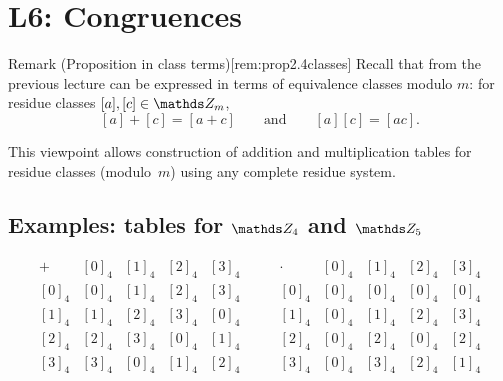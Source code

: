 \documentclass[10pt]{article}
\theoremstyle{definition}
\theoremstyle{plain}
\numberwithin{equation}{section}
\begin{document}
\section*{L6: Congruences}

\begin{define}{Remark (Proposition  in class terms)}[rem:prop2.4classes]
Recall that  from the previous lecture can be expressed in terms of
equivalence classes modulo $m$: for residue classes $[a],[c]\in\setZ_m$,
\[
[a]+[c]=[a+c]\qquad\text{and}\qquad [a][c]=[ac].
\]
\end{define}

This viewpoint allows construction of addition and multiplication tables for residue classes
(modulo~$m$) using any complete residue system.

\subsection*{Examples: tables for $\setZ_4$ and $\setZ_5$}
\[
  \begin{array}{c|cccc}
    + & \left[0\right]_4 & \left[1\right]_4 & \left[2\right]_4 & \left[3\right]_4\\\hline
    \left[0\right]_4 & \left[0\right]_4 & \left[1\right]_4 & \left[2\right]_4 & \left[3\right]_4\\
    \left[1\right]_4 & \left[1\right]_4 & \left[2\right]_4 & \left[3\right]_4 & \left[0\right]_4\\
    \left[2\right]_4 & \left[2\right]_4 & \left[3\right]_4 & \left[0\right]_4 & \left[1\right]_4\\
    \left[3\right]_4 & \left[3\right]_4 & \left[0\right]_4 & \left[1\right]_4 & \left[2\right]_4
  \end{array}
  \qquad
  \begin{array}{c|cccc}
    \cdot & \left[0\right]_4 & \left[1\right]_4 & \left[2\right]_4 & \left[3\right]_4\\\hline
    \left[0\right]_4 & \left[0\right]_4 & \left[0\right]_4 & \left[0\right]_4 & \left[0\right]_4\\
    \left[1\right]_4 & \left[0\right]_4 & \left[1\right]_4 & \left[2\right]_4 & \left[3\right]_4\\
    \left[2\right]_4 & \left[0\right]_4 & \left[2\right]_4 & \left[0\right]_4 & \left[2\right]_4\\
    \left[3\right]_4 & \left[0\right]_4 & \left[3\right]_4 & \left[2\right]_4 & \left[1\right]_4
  \end{array}
\]
\end{document}
